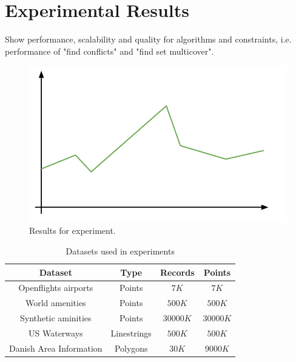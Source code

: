 \section{Experimental Results}
Show performance, scalability and quality for algorithms and constraints, i.e. performance of "find conflicts" and "find set multicover".

\begin{figure}[htbp]
\begin{center}
\includegraphics[scale=.5]{figs/cvl_todo.pdf}
\caption{Results for experiment.}
\label{fig:results-x}
\end{center}
\end{figure}

\begin{table}[htdp]
\caption{Datasets used in experiments}
\begin{center}
\begin{tabular}{|c|c|c|c|}
\hline
\textbf{Dataset} & \textbf{Type} & \textbf{Records} & \textbf{Points} \\
\hline
Openflights airports & Points & $7K$ & $7K$ \\
World amenities & Points & $500K$ & $500K$ \\
Synthetic aminities & Points & $30000K$ & $30000K$ \\
US Waterways & Linestrings & $500K$ & $500K$ \\
Danish Area Information & Polygons & $30K$ & $9000K$ \\
\hline
\end{tabular}
\end{center}
\label{default}
\end{table}%
